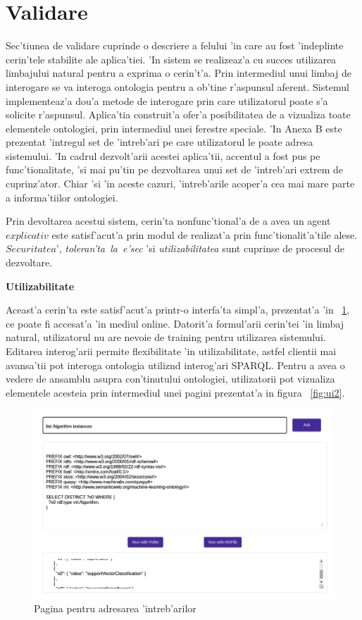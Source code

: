 \documentclass[12pt,a4paper,twoside]{report}
\begin{document}
\section{Validare}

Sec'tiunea de validare cuprinde o descriere a felului 'in care au fost 'indeplinte cerin'tele stabilite ale aplica'tiei. 'In sistem se realizeaz'a cu succes utilizarea limbajului natural pentru a exprima o cerin't'a. Prin intermediul unui limbaj de interogare se va interoga ontologia pentru a ob'tine r'aspunsul aferent. Sistemul implementeaz'a dou'a metode de interogare prin care utilizatorul poate s'a solicite r'aspunsul. Aplica'tia construit'a ofer'a posibilitatea de a vizualiza toate elementele ontologiei, prin intermediul unei ferestre speciale. 'In Anexa B este prezentat 'intregul set de 'intreb'ari pe care utilizatorul le poate adresa sistemului. 'In cadrul dezvolt'arii acestei aplica'tii, accentul a fost pus pe func'tionalitate, 'si mai pu'tin pe dezvoltarea unui set de 'intreb'ari extrem de cuprinz'ator. Chiar 'si 'in aceste cazuri, 'intreb'arile acoper'a cea mai mare parte a informa'tiilor ontologiei.

Prin devoltarea acestui sistem, cerin'ta nonfunc'tional'a de a avea un agent $explicativ$ este satisf'acut'a prin modul de realizat'a prin func'tionalit'a'tile alese. $Securitatea$', {\it toleran'ta\ la\ e'sec} 'si {\it utilizabilitatea} sunt cuprinse de procesul de dezvoltare.


{\bf Utilizabilitate}

Aceast'a cerin'ta este satisf'acut'a printr-o interfa'ta simpl'a, prezentat'a 'in ~\ref{fig:ui1}, ce poate fi accesat'a 'in mediul online. Datorit'a formul'arii cerin'tei 'in limbaj natural, utilizatorul nu are nevoie de training pentru utilizarea sistemului. Editarea interog'arii permite flexibilitate 'in utilizabilitate, astfel clientii mai avansa'tii pot interoga ontologia utiliz\ia nd interog'ari SPARQL. Pentru a avea o vedere de ansamblu asupra con'tinutului ontologiei, utilizatorii pot vizualiza elementele acesteia prin intermediul unei pagini prezentat'a in figura ~\ref{fig:ui2}.


\begin{figure}
    \centering
    \includegraphics[width = 0.65 \linewidth]{img/pg1_cut.png}
        \caption{Pagina pentru adresarea 'intreb'arilor}
    \label{fig:ui1}
\end{figure}
\end{document}
